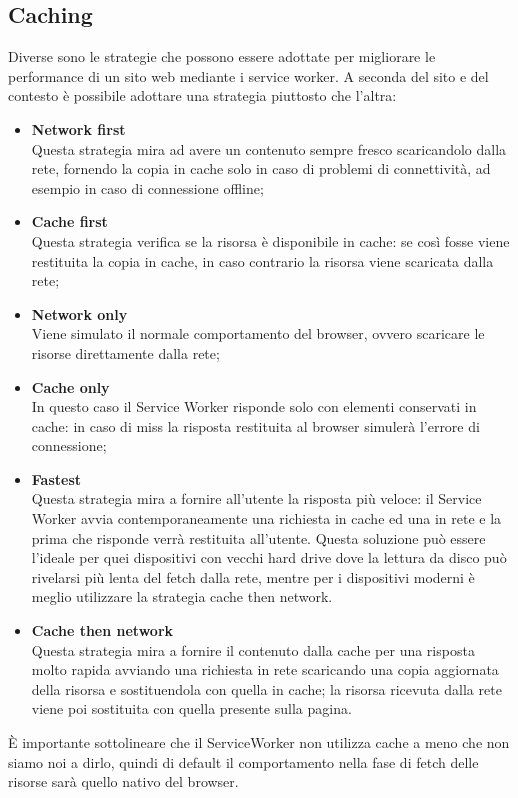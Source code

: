 \documentclass[11pt ,a4paper , twoside , openright ]{article}
\begin{document}
\subsection{Caching}
Diverse sono le strategie che possono essere adottate per migliorare le performance di un sito web mediante i service worker. A seconda del sito e del contesto è possibile adottare una strategia piuttosto che l’altra:
\begin{itemize}
	\item \textbf{Network first} \\
	Questa strategia mira ad avere un contenuto sempre fresco scaricandolo dalla rete, fornendo la copia in cache solo in caso di problemi di connettività, ad esempio in caso di connessione offline;
	\item \textbf{Cache first} \\
	Questa strategia verifica se la risorsa è disponibile in cache: se così fosse viene restituita la copia in cache, in caso contrario la risorsa viene scaricata dalla rete;
	\item \textbf{Network only} \\
	Viene simulato il normale comportamento del browser, ovvero scaricare le risorse direttamente dalla rete;
	\item \textbf{Cache only} \\
	In questo caso il Service Worker risponde solo con elementi conservati in cache: in caso di miss la risposta restituita al browser simulerà l’errore di connessione;
	\item \textbf{Fastest} \\
	Questa strategia mira a fornire all’utente la risposta più veloce: il Service Worker avvia contemporaneamente una richiesta in cache ed una in rete e la prima che risponde verrà restituita all’utente.
	Questa soluzione può essere l’ideale per quei dispositivi con vecchi hard drive dove la lettura da disco può  rivelarsi più lenta del fetch dalla rete, mentre per i dispositivi moderni è meglio utilizzare la strategia cache then network.
	\item \textbf{Cache then network} \\
	Questa strategia mira a fornire il contenuto dalla cache per una risposta molto rapida avviando una richiesta in rete scaricando una copia aggiornata della risorsa e sostituendola con quella in cache; la risorsa ricevuta dalla rete viene poi sostituita con quella presente sulla pagina.
\end{itemize}
È importante sottolineare che il ServiceWorker non utilizza cache a meno che non siamo noi a dirlo, quindi di default il comportamento nella fase di fetch delle risorse sarà quello nativo del browser.
\end{document}
